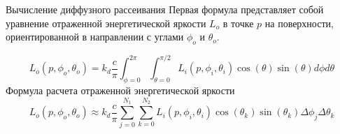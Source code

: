\documentclass{beamer}
\begin{document}
	\begin{frame}{Вычисление диффузного рассеивания}
		Первая формула представляет собой уравнение отраженной энергетической яркости $L_o$ в точке $p$ на поверхности, ориентированной в направлении с углами $\phi_o$ и $\theta_o$.

		\[
			L_o(p,\phi_o,\theta_o) = k_d \frac{c}{\pi}
			\int_{\phi=0}^{2\pi} \int_{\theta=0}^{\pi / 2}
			L_i(p, \phi_i, \theta_i) \cos(\theta) \sin(\theta) d\phi d\theta
		\]			
			Формула расчета отраженной энергетической яркости
	\[
		L_o(p,\phi_o,\theta_o) \approx k_d \frac{c }{\pi} %
		\sum_{j=0}^{N_1} \sum_{k=0}^{N_2}
		L_i(p, \phi_i, \theta_i) \cos(\theta_k) \sin(\theta_k) \Delta \phi_j \Delta \theta_k
	\]
	\end{frame}

	\fi
	
\end{document}
